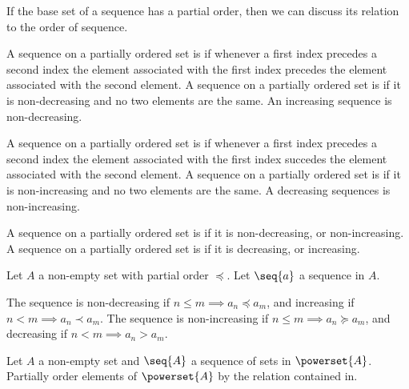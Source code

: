 
\sbasic




\sstart



If the base set of a
sequence has a partial
order, then we can
discuss its relation
to the order
of sequence.


A sequence on a partially
ordered set is
if whenever
a first index precedes
a second index the element
associated with the
first index precedes
the element associated with
the second element.
A sequence on a partially
ordered set is
if it is non-decreasing and
no two elements are the same.
An increasing sequence is
non-decreasing.

A sequence on a partially
ordered set is
if whenever
a first index precedes
a second index the element
associated with the
first index succedes
the element associated with
the second element.
A sequence on a partially
ordered set is
if it is non-increasing and
no two elements are the same.
A decreasing sequences is
non-increasing.

A sequence on a partially
ordered set is
if it is non-decreasing,
or non-increasing.
A sequence on a partially
ordered set is
if it is decreasing,
or increasing.



Let $A$ a non-empty set with
partial order $\preceq$.
Let $\seq{a}$ a sequence in $A$.

The sequence is
non-decreasing if
$n \leq m \implies a_n \preceq a_m$,
and increasing if
$n < m \implies a_n \prec a_m$.
The sequence is
non-increasing if
$n \leq m \implies a_n \succeq a_m$,
and decreasing if
$n < m \implies a_n > a_m$.


\begin{expl}
  Let $A$ a non-empty set
  and $\seq{A}$ a sequence of
  sets in $\powerset{A}$.
  Partially order elements
  of $\powerset{A}$ by
  the relation contained in.
\end{expl}

\strats
